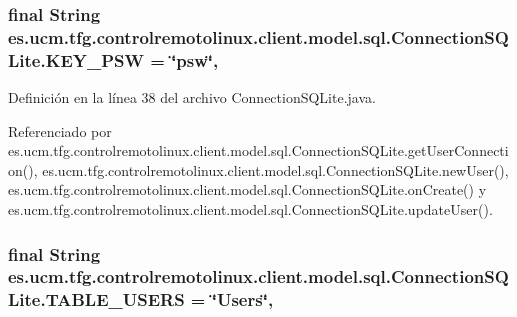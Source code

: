 \hypertarget{classes_1_1ucm_1_1tfg_1_1controlremotolinux_1_1client_1_1model_1_1sql_1_1ConnectionSQLite_a9f0f2ae30756dfa124bb644736e6a667}{
\subsubsection[{K\-E\-Y\-\_\-\-P\-S\-W}]{\setlength{\rightskip}{0pt plus 5cm}final String es.\-ucm.\-tfg.\-controlremotolinux.\-client.\-model.\-sql.\-Connection\-S\-Q\-Lite.\-K\-E\-Y\-\_\-\-P\-S\-W = \char`\"{}psw\char`\"{}\hspace{0.3cm}{\ttfamily [static]}, {\ttfamily [private]}}}\label{classes_1_1ucm_1_1tfg_1_1controlremotolinux_1_1client_1_1model_1_1sql_1_1ConnectionSQLite_a9f0f2ae30756dfa124bb644736e6a667}


Definición en la línea 38 del archivo Connection\-S\-Q\-Lite.\-java.



Referenciado por es.\-ucm.\-tfg.\-controlremotolinux.\-client.\-model.\-sql.\-Connection\-S\-Q\-Lite.\-get\-User\-Connection(), es.\-ucm.\-tfg.\-controlremotolinux.\-client.\-model.\-sql.\-Connection\-S\-Q\-Lite.\-new\-User(), es.\-ucm.\-tfg.\-controlremotolinux.\-client.\-model.\-sql.\-Connection\-S\-Q\-Lite.\-on\-Create() y es.\-ucm.\-tfg.\-controlremotolinux.\-client.\-model.\-sql.\-Connection\-S\-Q\-Lite.\-update\-User().

\hypertarget{classes_1_1ucm_1_1tfg_1_1controlremotolinux_1_1client_1_1model_1_1sql_1_1ConnectionSQLite_a9b3967aef91ed2398b01da3f004b7ce5}{
\subsubsection[{T\-A\-B\-L\-E\-\_\-\-U\-S\-E\-R\-S}]{\setlength{\rightskip}{0pt plus 5cm}final String es.\-ucm.\-tfg.\-controlremotolinux.\-client.\-model.\-sql.\-Connection\-S\-Q\-Lite.\-T\-A\-B\-L\-E\-\_\-\-U\-S\-E\-R\-S = \char`\"{}Users\char`\"{}\hspace{0.3cm}{\ttfamily [static]}, {\ttfamily [private]}}}\label{classes_1_1ucm_1_1tfg_1_1controlremotolinux_1_1client_1_1model_1_1sql_1_1ConnectionSQLite_a9b3967aef91ed2398b01da3f004b7ce5}


